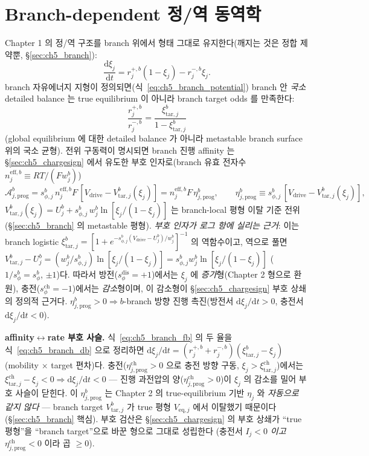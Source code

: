 \documentclass[11pt,a4paper]{article}
\newcommand{\dd}{\mathrm{d}}
\newcommand{\eff}{\mathrm{eff}}
\newcommand{\eq}{\mathrm{eq}}
\newcommand{\drive}{\mathrm{drive}}
\newcommand{\dis}{\mathrm{dis}}
\newcommand{\chg}{\mathrm{ch}}
\newcommand{\tar}{\mathrm{tar}}
\newcommand{\prog}{\mathrm{prog}}
\begin{document}
\section{Branch-dependent 정/역 동역학}\label{sec:ch5_kinetics}
Chapter 1 의 정/역 구조를 branch 위에서 형태 그대로 유지한다(깨지는 것은 정합 제약뿐, \S\ref{sec:ch5_branch}):
\begin{equation}
\frac{\dd\xi_j}{\dd t}=r_j^{+,b}(1-\xi_j)-r_j^{-,b}\xi_j.
\label{eq:ch5_branch_fb}
\end{equation}
branch 자유에너지 지형이 정의되면(식~\eqref{eq:ch5_branch_potential}) branch 안 \emph{국소} detailed balance 는
true equilibrium 이 아니라 branch target odds 를 만족한다:
\begin{equation}
\frac{r_j^{+,b}}{r_j^{-,b}}=\frac{\xi_{\tar,j}^b}{1-\xi_{\tar,j}^b}
\label{eq:ch5_branch_db}
\end{equation}
(global equilibrium 에 대한 detailed balance 가 아니라 metastable branch surface 위의 국소 균형). 전위 구동력이
명시되면 branch 진행 affinity 는 \S\ref{sec:ch5_chargesign} 에서 유도한 부호 인자로(branch 유효 전자수
$n_j^{\eff,b}\equiv RT/(Fw_j^b)$)
\begin{equation}
\mathcal A_{j,\prog}^b=s_{\phi,j}^b\,n_j^{\eff,b}F\,[V_\drive-V_{\tar,j}^b(\xi_j)]=n_j^{\eff,b}F\,\eta_{j,\prog}^b,
\qquad \eta_{j,\prog}^b\equiv s_{\phi,j}^b\,[V_\drive-V_{\tar,j}^b(\xi_j)],
\label{eq:ch5_branch_affinity}
\end{equation}
$V_{\tar,j}^b(\xi_j)=U_j^b+s_{\phi,j}^b\,w_j^b\ln[\xi_j/(1-\xi_j)]$ 는 branch-local 평형 이탈 기준 전위
(\S\ref{sec:ch5_branch} 의 metastable 평형). \emph{부호 인자가 로그 항에 실리는 근거}: 이는 branch logistic
$\xi_{\tar,j}^b=[1+e^{-s_{\phi,j}^b(V_\drive-U_j^b)/w_j^b}]^{-1}$ 의 역함수이고, 역으로 풀면
$V_{\tar,j}^b-U_j^b=(w_j^b/s_{\phi,j}^b)\ln[\xi_j/(1-\xi_j)]=s_{\phi,j}^b w_j^b\ln[\xi_j/(1-\xi_j)]$
($1/s_{\phi}^b=s_\phi^b$, $\pm1$)다. 따라서 방전($s_\phi^\dis=+1$)에서는 $\xi_j$ 에 \emph{증가}형(Chapter 2 형으로
환원), 충전($s_\phi^\chg=-1$)에서는 \emph{감소}형이며, 이 감소형이 \S\ref{sec:ch5_chargesign} 부호 상쇄의 정의적
근거다. $\eta_{j,\prog}^b>0\Rightarrow b$-branch 방향 진행 촉진(방전서 $\dd\xi_j/\dd t>0$, 충전서
$\dd\xi_j/\dd t<0$).

\textbf{affinity$\leftrightarrow$rate 부호 사슬.} 식~\eqref{eq:ch5_branch_fb} 의 두 율을 식~\eqref{eq:ch5_branch_db}
으로 정리하면 $\dd\xi_j/\dd t=(r_j^{+,b}+r_j^{-,b})(\xi_{\tar,j}^b-\xi_j)$(mobility $\times$ target 편차)다.
충전($\eta_{j,\prog}^\chg>0$ 으로 충전 방향 구동, $\xi_j>\xi_{\tar,j}^\chg$)에서는 $\xi_{\tar,j}^\chg-\xi_j<0
\Rightarrow\dd\xi_j/\dd t<0$ — 진행 과전압의 양($\eta_{j,\prog}^\chg>0$)이 $\xi_j$ 의 감소를 밀어 부호 사슬이
닫힌다. 이 $\eta_{j,\prog}^b$ 는 Chapter 2 의 true-equilibrium 기반 $\eta_j$ 와 \emph{자동으로 같지 않다} —
branch target $V_{\tar,j}^b$ 가 true 평형 $V_{\eq,j}$ 에서 이탈했기 때문이다(\S\ref{sec:ch5_branch} 핵심). 부호
검산은 \S\ref{sec:ch5_chargesign} 의 부호 상쇄가 ``true 평형''을 ``branch target''으로 바꾼 형으로 그대로 성립한다
(충전서 $I_j<0$ \emph{이고} $\eta_{j,\prog}^\chg<0$ 이라 곱 $\ge0$).
\end{document}
